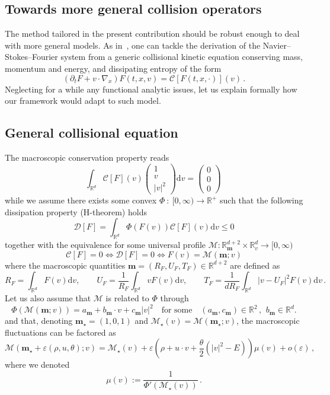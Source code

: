 \documentclass[10pt]{amsart}
\theoremstyle{definition}\newtheorem{defi}[theo]{Definition}\newtheorem{rema}[theo]{Remark}\newtheorem{exam}[theo]{Example}\newtheorem{exem}[theo]{Example}\newtheorem{nota}[theo]{Notation}
\renewcommand{\d}{\mathrm{d}}
\newcommand{\R}{\mathbb{R}}
\newcommand{\CC}{\mathcal{C}}
\newcommand{\DD}{\mathcal{D}}
\newcommand{\MM}{\mathcal{M}}
\renewcommand*\le{\leqslant}
\newcommand*\eps{{\varepsilon}}
\begin{document}
\subsection{Towards more general collision operators}\label{scn:general_collisions}


The method tailored in the present contribution should be robust enough to deal with more general models. As in~\cite{BaGoLe1}, one can tackle the derivation of the Navier--Stokes--Fourier system from a generic collisional kinetic equation conserving mass, momentum and energy, and dissipating entropy of the form
\begin{equation}\label{eq:Kin-general}
(\partial_t F + v \cdot \nabla_x) F(t, x, v) = \CC[F(t, x, \cdot)](v) \,.
\end{equation}
Neglecting for a while any functional analytic issues, let us explain formally how our framework would adapt to such model.

\subsection*{General collisional equation}
The macroscopic conservation property reads
\[
\int_{\R^d} \CC[F](v) \left(
\begin{array}{c}
1 \\ v \\ |v|^2
\end{array} \right) \d v = \left(
\begin{array}{c}
0 \\ 0 \\ 0
\end{array} \right) \,
\]
while we assume there exists some convex $\Phi\::\:[0,\infty) \to\R^{+}$ such that the following dissipation property (H-theorem) holds
\[
\DD[F] = \int_{ \R^d } \Phi(F(v)) \CC[F](v) \d v \le 0
\]
together with the equivalence for some universal profile $\MM : \R^{d+2}_{\bm m} \times \R^d_v \to [0, \infty)$
\[
\CC[F] = 0 \iff \DD[F] = 0 \iff F(v) = \MM \left({\bm m} ; v \right)
\]
where the macroscopic quantities ${\bm m} = (R_F, U_F, T_F) \in \R^{d+2}$ are defined as
\[
R_F = \int_{ \R^d } F(v) \d v, \qquad U_F = \frac{1}{R_F} \int_{\R^d} v F(v) \d v, \qquad T_F = \frac{1}{d R_F} \int_{ \R^d } |v-U_F|^2 F(v) \d v \,.
\]
Let us also assume that $\MM$ is related to $\Phi$ through
\begin{equation}\label{eq:MMstar}
\Phi(\MM(\bm{m} ; v)) = a_{\bm m} + b_{\bm m} \cdot v + c_{\bm m} | v |^2 \quad \text{for some} \quad (a_{\bm m}, c_{\bm m}) \in \R^{2}\,,\,\:b_{\bm m} \in \R^{d}.
\end{equation}
and that, denoting ${\bm m}_\star = (1,0,1)$ and $\MM_\star(v) = \MM({\bm m}_\star ; v)$, the macroscopic fluctuations can be factored as
\[
\MM\left({\bm m}_\star + \eps (\rho, u, \theta) ; v \right) = \MM_\star(v) + \eps \left(\rho + u \cdot v + \frac{ \theta }{2} \left(|v|^2 - E\right) \right) \mu(v) + o(\eps) \,,
\]
where we denoted
\[
\mu(v) := \frac{1}{ \Phi'(\MM_\star(v)) } \,.
\]
\end{document}
